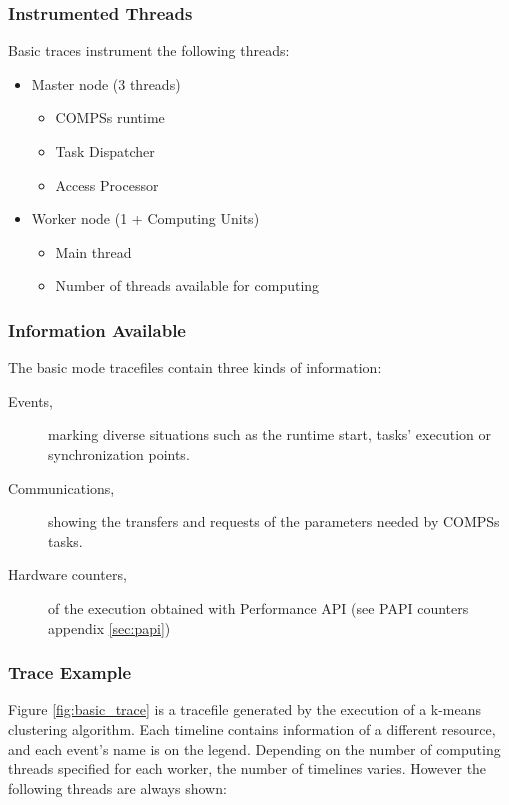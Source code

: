 \subsubsection{Instrumented Threads}


Basic traces instrument the following threads:

\begin{itemize}
 \item Master node (3 threads)
 \begin {itemize}
 \item COMPSs runtime
 \item Task Dispatcher
 \item Access Processor
 \end{itemize}
 \item Worker node (1 + Computing Units)
 \begin{itemize}
  \item Main thread
  \item Number of threads available for computing
 \end{itemize}
\end{itemize}

\subsubsection{Information Available}

The basic mode tracefiles contain three kinds of information:

\begin{description}
 \item [Events,] marking diverse situations such as the runtime start, tasks' execution or synchronization points.
 \item [Communications,] showing the transfers and requests of the parameters needed by COMPSs tasks.
 \item [Hardware counters,] of the execution obtained with Performance API (see PAPI counters appendix \ref{sec:papi})
\end{description}


\subsubsection{Trace Example}

Figure \ref{fig:basic_trace} is a tracefile generated by the execution of a k-means clustering algorithm. Each timeline contains information of a 
different resource, and each event's name is on the legend. Depending on the number of computing threads specified for each worker, the number of timelines varies. 
However the following threads are always shown:



